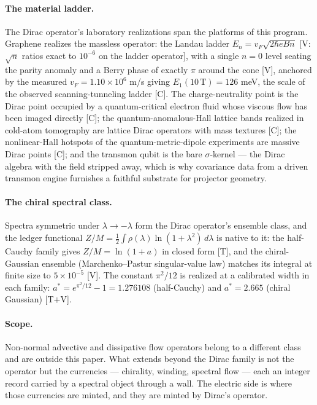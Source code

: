 \documentclass[11pt]{article}
\theoremstyle{definition}
\theoremstyle{plain}
\begin{document}
\paragraph{The material ladder.}
The Dirac operator's laboratory realizations span the platforms of this program.
Graphene realizes the massless operator: the Landau ladder
$E_n = v_F\sqrt{2\hbar e B n}$ [V: $\sqrt{n}$ ratios exact to $10^{-6}$ on the
ladder operator], with a single $n = 0$ level seating the parity anomaly and a
Berry phase of exactly $\pi$ around the cone [V], anchored by the measured
$v_F = 1.10\times 10^{6}$ m/s giving $E_1(10\,\mathrm{T}) = 126$ meV, the scale of
the observed scanning-tunneling ladder [C]. The charge-neutrality point is the
Dirac point occupied by a quantum-critical electron fluid whose viscous flow has
been imaged directly [C]; the quantum-anomalous-Hall lattice bands realized in
cold-atom tomography are lattice Dirac operators with mass textures [C]; the
nonlinear-Hall hotspots of the quantum-metric-dipole experiments are massive Dirac
points [C]; and the transmon qubit is the bare $\sigma$-kernel --- the Dirac
algebra with the field stripped away, which is why covariance data from a driven
transmon engine furnishes a faithful substrate for projector geometry.

\paragraph{The chiral spectral class.}
Spectra symmetric under $\lambda \to -\lambda$ form the Dirac operator's ensemble
class, and the ledger functional
$Z/M = \tfrac{1}{2}\int \rho(\lambda)\ln(1+\lambda^{2})\,d\lambda$ is native to it:
the half-Cauchy family gives $Z/M = \ln(1+a)$ in closed form [T], and the
chiral-Gaussian ensemble (Marchenko--Pastur singular-value law) matches its
integral at finite size to $5\times 10^{-5}$ [V]. The constant $\pi^{2}/12$ is
realized at a calibrated width in each family: $a^{*} = e^{\pi^{2}/12} - 1 =
1.276108$ (half-Cauchy) and $a^{*} = 2.665$ (chiral Gaussian) [T$+$V].

\paragraph{Scope.}
Non-normal advective and dissipative flow operators belong to a different class and
are outside this paper. What extends beyond the Dirac family is not the operator
but the currencies --- chirality, winding, spectral flow --- each an integer record
carried by a spectral object through a wall. The electric side is where those
currencies are minted, and they are minted by Dirac's operator.
\end{document}
